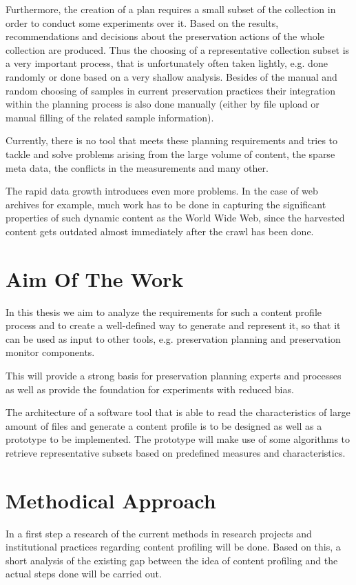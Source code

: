 Furthermore, the creation of a plan requires a small subset of the collection in order to conduct some experiments over it. Based on the results, recommendations and decisions about the preservation actions of the whole collection are produced. Thus the choosing of a representative collection subset is a very important process, that is unfortunately often taken lightly, e.g. done randomly or done based on a very shallow analysis. Besides of the manual and random choosing of samples in current preservation practices their integration within the planning process is also done manually (either by file upload or manual filling of the related sample information).

Currently, there is no tool that meets these planning requirements and tries to tackle and solve problems arising from the large volume of content, the sparse meta data, the conflicts in the measurements and many other.

The rapid data growth introduces even more problems. In the case of web archives for example, much work has to be done in capturing the significant properties of such dynamic content as the World Wide Web, since the harvested content gets outdated almost immediately after the crawl has been done.

\section{Aim Of The Work}
In this thesis we aim to analyze the requirements for such a content profile process and to create a well-defined way to generate and represent it, so that it can be used as input to other tools, e.g. preservation planning and preservation monitor components.

This will provide a strong basis for preservation planning experts and processes as well as provide the foundation for experiments with reduced bias.

The architecture of a software tool that is able to read the characteristics of large amount of files and generate a content profile is to be designed as well as a prototype to be implemented. The prototype will make use of some algorithms to retrieve representative subsets based on predefined measures and characteristics.

\section{Methodical Approach}
In a first step a research of the current methods in research projects and institutional practices regarding content profiling will be done. Based on this, a short analysis of the existing gap between the idea of content profiling and the actual steps done will be carried out. 

